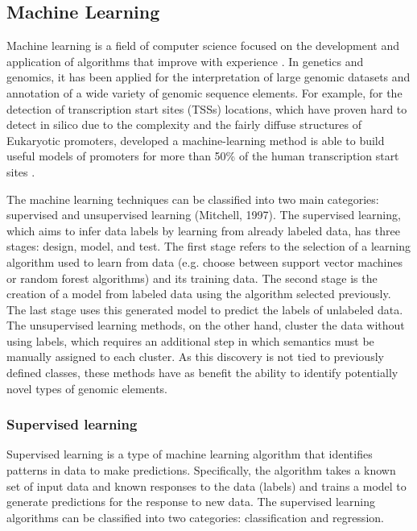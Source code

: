 \subsection{Machine Learning}

Machine learning is a field of computer science focused on the development and application of algorithms that improve with experience \cite{mitchell1997machine}.
In genetics and genomics, it has been applied
 for the interpretation of large genomic datasets and annotation of a wide variety of genomic sequence elements.
For example, for the detection of  transcription start sites (TSSs) locations, which have proven hard to detect in silico due to the complexity and the fairly diffuse structures of Eukaryotic promoters,  developed a machine-learning method is able to build useful models of promoters for more than 50\% of the human transcription start sites \cite{down2002computational}.

The machine learning techniques can be classified into two main categories: supervised and unsupervised learning (Mitchell, 1997). The supervised learning, which aims to infer data labels by learning from already labeled data, has three stages: design, model, and test. The first stage refers to the selection of a learning algorithm used to learn from data (e.g. choose between support vector machines or random forest algorithms) and its training data. The second stage is the creation of a model from labeled data using the algorithm selected previously.  The last stage uses this generated model to  predict the labels of unlabeled data.
The unsupervised learning methods, on the other hand,
cluster the data without using labels, which requires an additional step in which semantics must be manually assigned to each cluster. As this discovery is not tied to previously defined classes, these methods have as benefit the ability to identify potentially novel types of genomic elements.




\subsubsection{Supervised learning}

Supervised learning is a type of machine learning algorithm that identifies patterns in data to make predictions.
Specifically, the algorithm takes a known set of input data and known responses to the data (labels) and trains a model to generate predictions for the response to new data.
The supervised learning algorithms can be classified into two categories: classification and regression.

